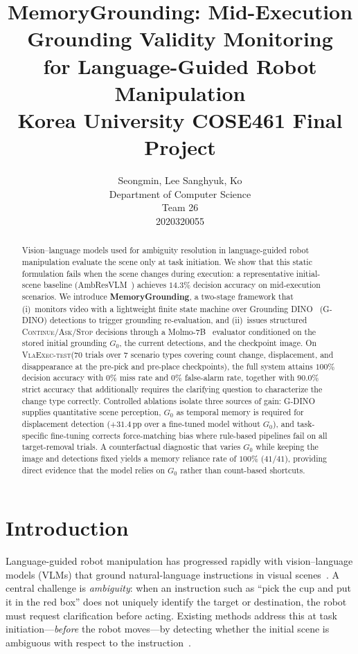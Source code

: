 \documentclass{article}
\title{
  MemoryGrounding: Mid-Execution Grounding Validity Monitoring \\
  for Language-Guided Robot Manipulation \\
  \vspace{1em}
  \small{\normalfont Korea University COSE461 Final Project}
}
\author{
  Seongmin, Lee\; Sanghyuk, Ko \\
  Department of Computer Science \\
  Team 26 \\
  2020320055\;   2020320035
}
\newcommand{\datasettest}{\textsc{VlaExec-test}}
\begin{document}
\maketitle

\begin{abstract}
Vision--language models used for ambiguity resolution in language-guided
robot manipulation evaluate the scene only at task initiation. We show
that this static formulation fails when the scene changes during
execution: a representative initial-scene baseline
(AmbResVLM~\cite{ambresvlm}) achieves $14.3\%$ decision accuracy on
mid-execution scenarios. We introduce \textbf{MemoryGrounding}, a
two-stage framework that (i)~monitors video with a lightweight finite
state machine over Grounding DINO~\cite{gdino} (G-DINO) detections to
trigger grounding re-evaluation, and (ii)~issues structured
\textsc{Continue}/\textsc{Ask}/\textsc{Stop} decisions through a
Molmo-7B~\cite{molmo} evaluator conditioned on the stored initial
grounding $G_0$, the current detections, and the checkpoint image. On
\datasettest (70 trials over 7 scenario types covering
count change, displacement, and disappearance at the pre-pick and
pre-place checkpoints), the full system attains $100\%$ decision
accuracy with $0\%$ miss rate and $0\%$ false-alarm rate, together with
$90.0\%$ strict accuracy that additionally requires the clarifying
question to characterize the change type correctly. Controlled ablations
isolate three sources of gain: G-DINO supplies quantitative scene
perception, $G_0$ as temporal memory is required for displacement
detection ($+31.4$\,pp over a fine-tuned model without $G_0$), and
task-specific fine-tuning corrects force-matching bias where rule-based
pipelines fail on all target-removal trials. A counterfactual diagnostic
that varies $G_0$ while keeping the image and detections fixed yields a
memory reliance rate of $100\%$ ($41/41$), providing direct evidence
that the model relies on $G_0$ rather than count-based shortcuts.
\end{abstract}

\section{Introduction}
\label{sec:intro}

Language-guided robot manipulation has progressed rapidly with
vision--language models (VLMs) that ground natural-language instructions
in visual scenes~\cite{molmo,rt2,openvla}. A central challenge is
\emph{ambiguity}: when an instruction such as ``pick the cup and put it
in the red box'' does not uniquely identify the target or destination,
the robot must request clarification before acting. Existing methods
address this at task initiation---\emph{before} the robot
moves---by detecting whether the initial scene is ambiguous with respect
to the instruction~\cite{ambresvlm,knowno,clara,lap,sgcot}.
\end{document}
